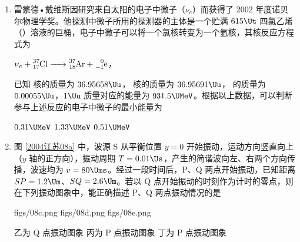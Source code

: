 \documentclass[\gkver]{gaokaozhenti}
\begin{document}
\begin{enumerate}

\item
雷蒙德•戴维斯因研究来自太阳的电子中微子（$\nu_{e}$）而获得了 2002 年度诺贝尔物理学奖。他探测中微子所用的探测器的主体是一个贮满 $615\Ut$ 四氯乙烯（）溶液的巨桶，电子中微子可以将一个氯核转变为一个氩核，其核反应方程式为

$\ce{\nu_{e} + ^{37}_{17}Cl -> ^{37}_{18}Ar + ^{0}_{-1}e}$，

已知  核的质量为 $36.95658\Uu$， 核的质量为 $36.95691\Uu$， 的质量为 $0.00055\Uu$，$1\Uu$ 质量对应的能量为 $931.5\UMeV$。根据以上数据，可以判断参与上述反应的电子中微子的最小能量为

\fourchoices[answer=A]
{$0.82\UMeV$}
{$0.31\UMeV$}
{$1.33\UMeV$}
{$0.51\UMeV$}


\item
图 \ref{2004江苏08a} 中，波源 S 从平衡位置 $y=0$ 开始振动，运动方向竖直向上（$y$ 轴的正方向），振动周期 $T=0.01\Us$，产生的简谐波向左、右两个方向传播，波速均为 $v=80\Ums$。经过一段时间后，P、Q 两点开始振动，已知距离 $SP=1.2\Um$、$SQ=2.6\Um$。若以 Q 点开始振动的时刻作为计时的零点，则在下列振动图象中，能正确描述 P、Q 两点振动情况的是

\onepicture[label=2004江苏08a, num=1, numstyle=arabic, showlabel=true, w=5.97cm]{}

{figs/08c.png}
{figs/08d.png}
{figs/08e.png}

{乙为 Q 点振动图象}
{丙为 P 点振动图象}
{丁为 P 点振动图象}


\end{enumerate}
\end{document}
